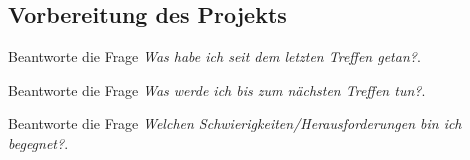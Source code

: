 \subsection{Vorbereitung des Projekts}

Beantworte die Frage \emph{Was habe ich seit dem letzten Treffen getan?}.

Beantworte die Frage \emph{Was werde ich bis zum n\"achsten Treffen tun?}.

Beantworte die Frage \emph{Welchen Schwierigkeiten/Herausforderungen bin ich begegnet?}.



